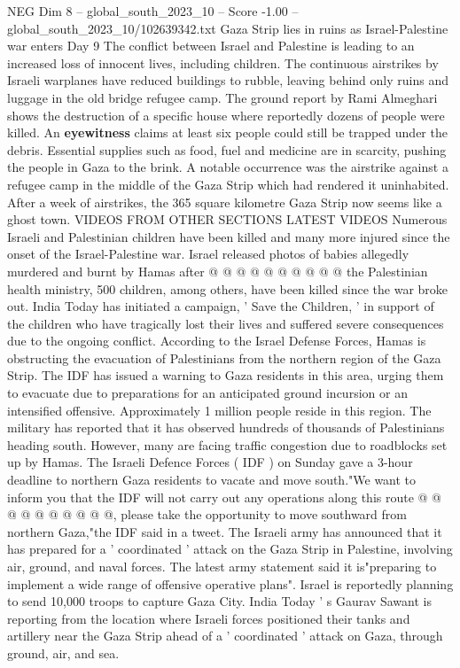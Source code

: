 \begin{textsample}{NEG Dim 8 – global\_south\_2023\_10 – Score -1.00 – global\_south\_2023\_10/102639342.txt}  \label{ex:f8_neg_096}
Gaza Strip lies in ruins as Israel-Palestine war enters Day 9 The conflict between Israel and Palestine is leading to an increased loss of innocent lives, including children.
The continuous airstrikes by Israeli warplanes have reduced buildings to rubble, leaving behind only ruins and luggage in the old bridge refugee camp.
The ground report by Rami Almeghari shows the destruction of a specific house where reportedly dozens of people were killed.
An \textbf{eyewitness} claims at least six people could still be trapped under the debris.
Essential supplies such as food, fuel and medicine are in scarcity, pushing the people in Gaza to the brink.
A notable occurrence was the airstrike against a refugee camp in the middle of the Gaza Strip which had rendered it uninhabited.
After a week of airstrikes, the 365 square kilometre Gaza Strip now seems like a ghost town.
VIDEOS FROM OTHER SECTIONS LATEST VIDEOS Numerous Israeli and Palestinian children have been killed and many more injured since the onset of the Israel-Palestine war.
Israel released photos of babies allegedly murdered and burnt by Hamas after @ @ @ @ @ @ @ @ @ @ the Palestinian health ministry, 500 children, among others, have been killed since the war broke out.
India Today has initiated a campaign, ' Save the Children, ' in support of the children who have tragically lost their lives and suffered severe consequences due to the ongoing conflict.
According to the Israel Defense Forces, Hamas is obstructing the evacuation of Palestinians from the northern region of the Gaza Strip.
The IDF has issued a warning to Gaza residents in this area, urging them to evacuate due to preparations for an anticipated ground incursion or an intensified offensive.
Approximately 1 million people reside in this region.
The military has reported that it has observed hundreds of thousands of Palestinians heading south.
However, many are facing traffic congestion due to roadblocks set up by Hamas.
The Israeli Defence Forces ( IDF ) on Sunday gave a 3-hour deadline to northern Gaza residents to vacate and move south."We want to inform you that the IDF will not carry out any operations along this route @ @ @ @ @ @ @ @ @ @, please take the opportunity to move southward from northern Gaza,"the IDF said in a tweet.
The Israeli army has announced that it has prepared for a ' coordinated ' attack on the Gaza Strip in Palestine, involving air, ground, and naval forces.
The latest army statement said it is"preparing to implement a wide range of offensive operative plans".
Israel is reportedly planning to send 10,000 troops to capture Gaza City.
India Today ' s Gaurav Sawant is reporting from the location where Israeli forces positioned their tanks and artillery near the Gaza Strip ahead of a ' coordinated ' attack on Gaza, through ground, air, and sea.

\end{textsample}
